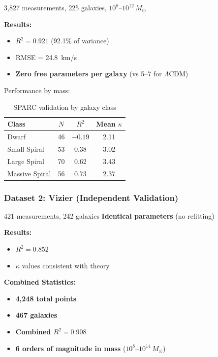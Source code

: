 \documentclass[11pt,a4paper]{article}
\theoremstyle{definition}
\theoremstyle{remark}
\begin{document}
	3,827 measurements, 225 galaxies, $10^8$--$10^{12}\, M_\odot$
	
	\textbf{Results:}
	\begin{itemize}
		\item \textbf{$R^2 = 0.921$} (92.1\% of variance)
		\item RMSE = 24.8~km/s
		\item \textbf{Zero free parameters per galaxy} (vs 5--7 for $\Lambda$CDM)
	\end{itemize}
	
	Performance by mass:
	
	\begin{table}[ht]
		\centering
		\caption{SPARC validation by galaxy class}
		\label{tab:sparc_validation}
		\begin{tabular}{@{}lccc@{}}
			\toprule
			Class & $N$ & $R^2$ & Mean $\kappa$ \\
			\midrule
			Dwarf & 46 & $-0.19$ & 2.11 \\
			Small Spiral & 53 & 0.38 & 3.02 \\
			Large Spiral & 70 & 0.62 & 3.43 \\
			Massive Spiral & 56 & 0.73 & 2.37 \\
			\bottomrule
		\end{tabular}
	\end{table}
	
	\subsubsection{Dataset 2: Vizier (Independent Validation)}
	
	421 measurements, 242 galaxies
	\textbf{Identical parameters} (no refitting)
	
	\textbf{Results:}
	\begin{itemize}
		\item \textbf{$R^2 = 0.852$}
		\item $\kappa$ values consistent with theory
	\end{itemize}
	
	\textbf{Combined Statistics:}
	\begin{itemize}
		\item \textbf{4,248 total points}
		\item \textbf{467 galaxies}
		\item \textbf{Combined $R^2 = 0.908$}
		\item \textbf{6 orders of magnitude in mass} ($10^8$--$10^{14}\, M_\odot$)
	\end{itemize}
	
\end{document}
